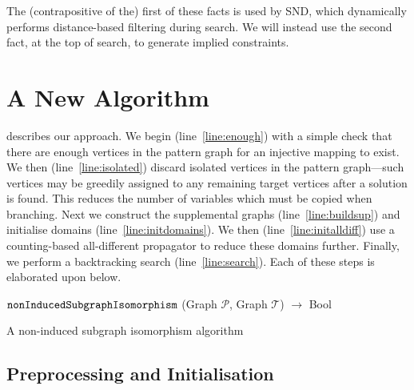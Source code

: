 \documentclass{llncs}
\newcommand{\lineref}[1]{line~\ref{#1}}
\begin{document}
\noindent The (contrapositive of the) first of these facts is used by SND, which dynamically
performs distance-based filtering during search. We will instead use the second fact, at the top of
search, to generate implied constraints.

\section{A New Algorithm}

 describes our approach.  We begin (\lineref{line:enough}) with a simple check
that there are enough vertices in the pattern graph for an injective mapping to exist.  We then
(\lineref{line:isolated}) discard isolated vertices in the pattern graph---such vertices may be
greedily assigned to any remaining target vertices after a solution is found. This reduces the
number of variables which must be copied when branching.  Next we construct the supplemental graphs
(\lineref{line:buildsup}) and initialise domains (\lineref{line:initdomains}). We then
(\lineref{line:initalldiff}) use a counting-based all-different propagator to reduce these domains
further. Finally, we perform a backtracking search (\lineref{line:search}). Each of these steps is
elaborated upon below.

\begin{algorithm}[b]
\DontPrintSemicolon
\nl $\FuncSty{nonInducedSubgraphIsomorphism}$ (Graph $\mathcal{P}$, Graph $\mathcal{T}$) $\rightarrow$ Bool \;
\nl {}

\caption{A non-induced subgraph isomorphism algorithm}
\label{algorithm:sip}
\end{algorithm}

\subsection{Preprocessing and Initialisation}
\end{document}
